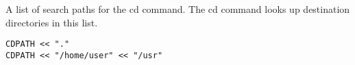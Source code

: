 \label{par:cdpath}

A list of search paths for the cd command.
The cd command looks up destination directories in this list.

\begin{lstlisting}[style=Groovybash, label={lst:example_cdpath}]
CDPATH << "."
CDPATH << "/home/user" << "/usr"
\end{lstlisting}

